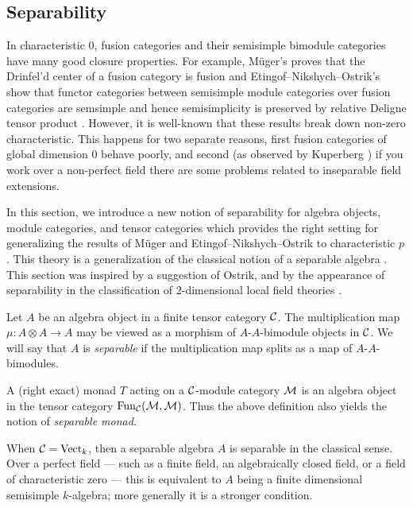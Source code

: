 \documentclass{amsart}
\begin{document}
\subsection{Separability} \label{sec-tc-separable}
In characteristic $0$, fusion categories and their semisimple bimodule categories have many good closure properties.  For example, M\"uger's proves that the Drinfel'd center  of a fusion category is fusion \cite[Theorem 3.16]{MR1966525} and Etingof--Nikshych--Ostrik's show that functor categories between semisimple module categories over fusion categories are semsimple and hence semisimplicity is preserved by relative Deligne tensor product \cite[Theorem 2.16]{MR2183279}.  However, it is well-known that these results break down non-zero characteristic.  This happens for two separate reasons, first fusion categories of global dimension $0$ behave poorly, and second (as observed by Kuperberg \cite[Question 5.1]{MR1995781}) if you work over a non-perfect field there are some problems related to inseparable field extensions.

In this section, we introduce a new notion of separability for algebra objects, module categories, and tensor categories which provides the right setting for generalizing the results of M\"uger and Etingof--Nikshych--Ostrik to characteristic $p$.  This theory is a generalization of the classical notion of a separable algebra \cite{???}.   This section was inspired by a suggestion of Ostrik, and by the appearance of separability in the classification of $2$-dimensional local field theories \cite{schommer-pries-thesis}.

\begin{definition}
	Let $A$ be an algebra object in a finite tensor category $\mathcal C$. The multiplication map $\mu: A \otimes A \to A$ may be viewed as a morphism of $A$-$A$-bimodule objects in $\mathcal C$. We will say that $A$ is {\em separable} if the multiplication map splits as a map of $A$-$A$-bimodules. 
\end{definition}

\begin{remark}
	A (right exact) monad $T$ acting on a $\mathcal C$-module category $\mathcal M$ is an algebra object in the tensor category $\operatorname{Fun}_\mathcal C(\mathcal M, \mathcal M)$. Thus the above definition also yields the notion of {\em separable monad}. 
\end{remark}

\begin{remark}
	When $\mathcal C = \mathrm{Vect}_k$, then a separable algebra $A$ is separable in the classical sense. Over a perfect field --- such as a finite field, an algebraically closed field, or a field of characteristic zero --- this is equivalent to $A$ being a finite dimensional semisimple $k$-algebra; more generally it is a stronger condition. 
\end{remark}
\end{document}
